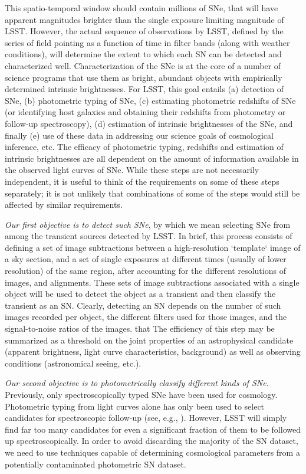 This spatio-temporal window should contain millions  of SNe, that will have apparent magnitudes brighter than the single
exposure limiting magnitude of LSST.  However, the actual sequence of
observations by LSST, defined by the series of field pointing as a
function of time in filter bands (along with weather conditions), will
determine the extent to which each SN can be detected and characterized
well.  Characterization of the SNe is at the core of a number of science
programs that use them as bright, abundant objects with empirically
determined intrinsic brightnesses. For LSST, this goal entails (a)
detection of SNe, (b) photometric typing of SNe, (c) estimating photometric
redshifts of SNe (or identifying host galaxies and obtaining their
redshifts from photometry or follow-up spectroscopy), (d) estimation of
intrinsic brightnesses of the SNe, and finally (e) use of these data in
addressing our science goals of cosmological inference, etc. The efficacy
of photometric typing, redshifts and estimation of intrinsic brightnesses
are all dependent on the amount of information available in the observed
light curves of SNe. While these steps are not necessarily independent, it
is useful to think of the requirements on some of these steps separately;
it is not unlikely  that combinations of some of the steps would still be
affected by similar requirements. 

{\emph{Our first objective is to detect such SNe}}, by which we mean
selecting SNe from among the transient sources detected by LSST.
In brief, this process consists of defining a set of image subtractions
between a high-resolution `template` image of a sky section, and a set of
single exposures at different times (usually of lower resolution) of the
same region, after accounting for the different resolutions of images, and
alignments. These sets of image subtractions associated with a single
object will be used to detect the object as a transient and then classify
the transient as an SN. Clearly, detecting an SN depends on the number of
such images recorded per object, the different filters used for those
images, and the signal-to-noise ratios of the images. %
that The efficiency of this step may be summarized as a threshold on the
joint properties of an astrophysical candidate (apparent brightness, light
curve characteristics, background) as well as observing conditions
(astronomical seeing, etc.).  

{\emph{Our second objective is to photometrically classify different kinds of SNe.}} 
Previously, only spectroscopically typed SNe have been used for cosmology. Photometric 
typing from light curves alone has only been used to select candidates for spectroscopic 
follow-up (see, e.g., \citet{Sako2008}). However, LSST will simply find far too many 
candidates for even a significant fraction of them to be followed up spectroscopically. In order to avoid 
discarding the majority of the SN dataset, we need to use techniques capable of 
determining cosmological parameters from a potentially contaminated photometric SN dataset.

